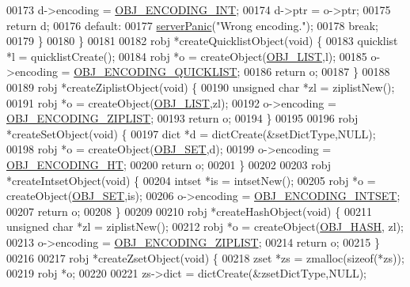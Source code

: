 \begin{DoxyCode}
00173         d->encoding = \hyperlink{server_8h_ae934cf008a0be0ef009c92c2d006a816}{OBJ\_ENCODING\_INT};
00174         d->ptr = o->ptr;
00175         \textcolor{keywordflow}{return} d;
00176     \textcolor{keywordflow}{default}:
00177         \hyperlink{server_8h_a11cc378e7778a830b41240578de3b204}{serverPanic}(\textcolor{stringliteral}{"Wrong encoding."});
00178         \textcolor{keywordflow}{break};
00179     \}
00180 \}
00181 
00182 robj *createQuicklistObject(\textcolor{keywordtype}{void}) \{
00183     quicklist *l = quicklistCreate();
00184     robj *o = createObject(\hyperlink{server_8h_a4a5f22a280949c97a0cb0d4213275126}{OBJ\_LIST},l);
00185     o->encoding = \hyperlink{server_8h_aec792aeed6d4bf83966672e6a23043b8}{OBJ\_ENCODING\_QUICKLIST};
00186     \textcolor{keywordflow}{return} o;
00187 \}
00188 
00189 robj *createZiplistObject(\textcolor{keywordtype}{void}) \{
00190     \textcolor{keywordtype}{unsigned} \textcolor{keywordtype}{char} *zl = ziplistNew();
00191     robj *o = createObject(\hyperlink{server_8h_a4a5f22a280949c97a0cb0d4213275126}{OBJ\_LIST},zl);
00192     o->encoding = \hyperlink{server_8h_aabf064ede983103f1fd0df2086e84eee}{OBJ\_ENCODING\_ZIPLIST};
00193     \textcolor{keywordflow}{return} o;
00194 \}
00195 
00196 robj *createSetObject(\textcolor{keywordtype}{void}) \{
00197     dict *d = dictCreate(&setDictType,NULL);
00198     robj *o = createObject(\hyperlink{server_8h_a8d179375a4aac33d3fa7aa80c8ccc75f}{OBJ\_SET},d);
00199     o->encoding = \hyperlink{server_8h_a9c10219f68afc557d510d108257d238b}{OBJ\_ENCODING\_HT};
00200     \textcolor{keywordflow}{return} o;
00201 \}
00202 
00203 robj *createIntsetObject(\textcolor{keywordtype}{void}) \{
00204     intset *is = intsetNew();
00205     robj *o = createObject(\hyperlink{server_8h_a8d179375a4aac33d3fa7aa80c8ccc75f}{OBJ\_SET},is);
00206     o->encoding = \hyperlink{server_8h_a214173987de21c3b7661fddd42b05873}{OBJ\_ENCODING\_INTSET};
00207     \textcolor{keywordflow}{return} o;
00208 \}
00209 
00210 robj *createHashObject(\textcolor{keywordtype}{void}) \{
00211     \textcolor{keywordtype}{unsigned} \textcolor{keywordtype}{char} *zl = ziplistNew();
00212     robj *o = createObject(\hyperlink{server_8h_a87c05ba4f7f36741864277f02a4423fb}{OBJ\_HASH}, zl);
00213     o->encoding = \hyperlink{server_8h_aabf064ede983103f1fd0df2086e84eee}{OBJ\_ENCODING\_ZIPLIST};
00214     \textcolor{keywordflow}{return} o;
00215 \}
00216 
00217 robj *createZsetObject(\textcolor{keywordtype}{void}) \{
00218     zset *zs = zmalloc(\textcolor{keyword}{sizeof}(*zs));
00219     robj *o;
00220 
00221     zs->dict = dictCreate(&zsetDictType,NULL);

\end{DoxyCode}
